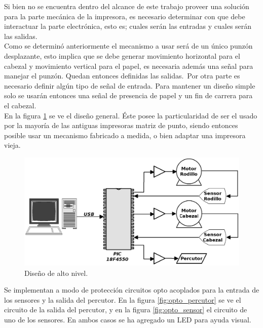Si bien no se encuentra dentro del alcance de este trabajo proveer una
soluci\'on para la parte mec\'anica de la impresora, es necesario determinar
con que debe interactuar la parte electr\'onica, esto es; cuales ser\'an las
entradas y cuales ser\'an las salidas.\\

Como se determin\'o anteriormente el mecanismo a usar ser\'a de un \'unico
punz\'on desplazante, esto implica que se debe generar movimiento horizontal
para el cabezal y movimiento vertical para el papel, es necesaria adem\'as una
se\~nal para manejar el punz\'on. Quedan entonces definidas las salidas.\
Por otra parte es necesario definir alg\'un tipo de se\~nal de entrada. Para
mantener un dise\~no simple solo se usar\'an entonces una se\~nal de presencia
de papel y un fin de carrera para el cabezal.\\

En la figura \ref{fig:pc_uc_motors} se ve el dise\~no general. \'Este posee la
particularidad de ser el usado por la mayor\'ia de las antiguas impresoras
matriz de punto, siendo entonces posible usar un mecanismo fabricado a medida,
o bien adaptar una impresora vieja.


\begin{figure}[htp]
\centering
\includegraphics[width=13cm]{./img/pc_uc_motors.png}
\caption{Dise\~no de alto nivel.}
\label{fig:pc_uc_motors}
\end{figure}

Se implementan a modo de protecci\'on circuitos opto acoplados para la
entrada de los sensores y la salida del percutor. En la figura
\ref{fig:opto_percutor} se ve el circuito de la salida del percutor, y en la
figura \ref{fig:opto_sensor} el circuito de uno de los sensores. En ambos
casos se ha agregado un LED para ayuda visual.\\

